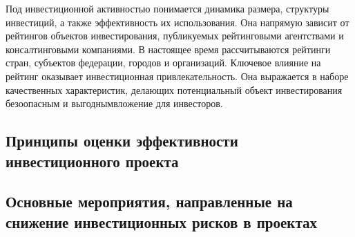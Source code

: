 Под инвестиционной активностью понимается динамика размера, структуры инвестиций, а также эффективность их использования.
Она напрямую зависит от рейтингов объектов инвестирования, публикуемых рейтинговыми агентствами и консалтинговыми компаниями.
В настоящее время рассчитываются рейтинги стран, субъектов федерации, городов и организаций.
Ключевое влияние на рейтинг оказывает инвестиционная привлекательность.
Она выражается в наборе качественных характеристик, делающих потенциальный объект  инвестирования безоопасным и выгоднымвложение для инвесторов.

















\subsection{Принципы оценки эффективности инвестиционного проекта}
\subsection{Основные мероприятия, направленные на снижение инвестиционных рисков в проектах}